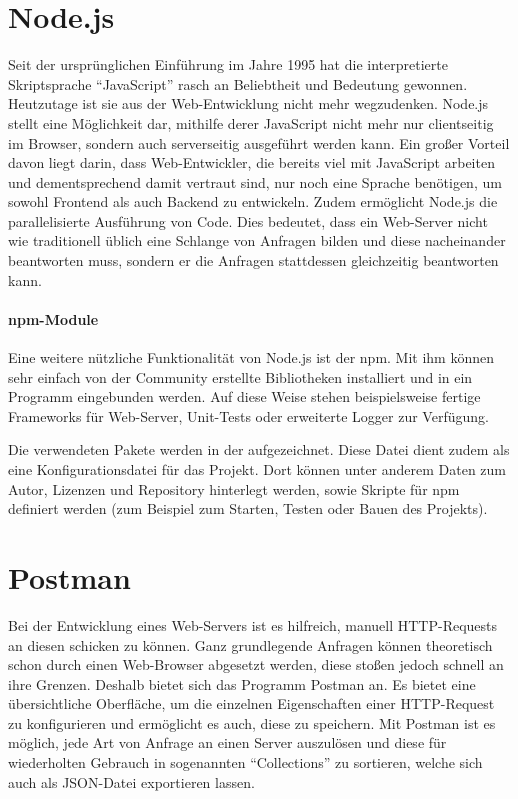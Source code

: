 \section{Node.js}
Seit der ursprünglichen Einführung im Jahre 1995 hat die interpretierte Skriptsprache \enquote{JavaScript} rasch an Beliebtheit und Bedeutung gewonnen.
Heutzutage ist sie aus der Web-Entwicklung nicht mehr wegzudenken.
Node.js stellt eine Möglichkeit dar, mithilfe derer JavaScript nicht mehr nur clientseitig im Browser, sondern auch serverseitig ausgeführt werden kann.
Ein großer Vorteil davon liegt darin, dass Web-Entwickler, die bereits viel mit JavaScript arbeiten und dementsprechend damit vertraut sind, nur noch eine Sprache benötigen, um sowohl Frontend als auch Backend zu entwickeln.
Zudem ermöglicht Node.js die parallelisierte Ausführung von Code.
Dies bedeutet, dass ein Web-Server nicht wie traditionell üblich eine Schlange von Anfragen bilden und diese nacheinander beantworten muss, sondern er die Anfragen stattdessen gleichzeitig beantworten kann.

\paragraph{\acs{npm}-Module}
Eine weitere nützliche Funktionalität von Node.js ist der \ac{npm}.
Mit ihm können sehr einfach von der Community erstellte Bibliotheken installiert und in ein Programm eingebunden werden.
Auf diese Weise stehen beispielsweise fertige Frameworks für Web-Server, Unit-Tests oder erweiterte Logger zur Verfügung.

Die verwendeten Pakete werden in der  aufgezeichnet.
Diese Datei dient zudem als eine Konfigurationsdatei für das Projekt.
Dort können unter anderem Daten zum Autor, Lizenzen und Repository hinterlegt werden, sowie Skripte für \ac{npm} definiert werden (zum Beispiel zum Starten, Testen oder Bauen des Projekts).

\section{Postman}
Bei der Entwicklung eines Web-Servers ist es hilfreich, manuell \ac{HTTP}-Requests an diesen schicken zu können.
Ganz grundlegende Anfragen können theoretisch schon durch einen Web-Browser abgesetzt werden, diese stoßen jedoch schnell an ihre Grenzen.
Deshalb bietet sich das Programm Postman an. Es bietet eine übersichtliche Oberfläche, um die einzelnen Eigenschaften einer \ac{HTTP}-Request zu konfigurieren und ermöglicht es auch, diese zu speichern.
Mit Postman ist es möglich, jede Art von Anfrage an einen Server auszulösen und diese für wiederholten Gebrauch in sogenannten \enquote{Collections} zu sortieren, welche sich auch als \ac{JSON}-Datei exportieren lassen.

